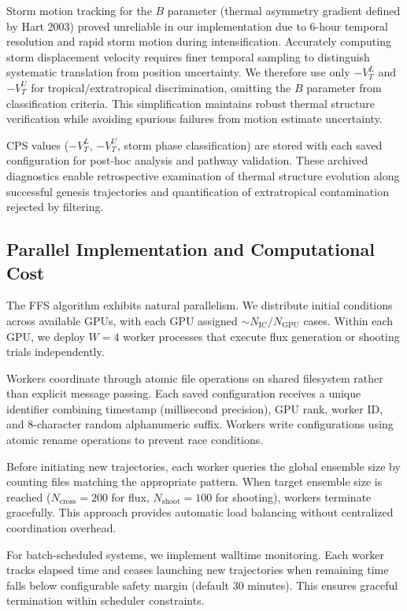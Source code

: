 \documentclass[11pt]{article}
\begin{document}
Storm motion tracking for the $B$ parameter (thermal asymmetry gradient defined by Hart 2003) proved unreliable in our implementation due to 6-hour temporal resolution and rapid storm motion during intensification. Accurately computing storm displacement velocity requires finer temporal sampling to distinguish systematic translation from position uncertainty. We therefore use only $-V_T^L$ and $-V_T^U$ for tropical/extratropical discrimination, omitting the $B$ parameter from classification criteria. This simplification maintains robust thermal structure verification while avoiding spurious failures from motion estimate uncertainty.

CPS values ($-V_T^L$, $-V_T^U$, storm phase classification) are stored with each saved configuration for post-hoc analysis and pathway validation. These archived diagnostics enable retrospective examination of thermal structure evolution along successful genesis trajectories and quantification of extratropical contamination rejected by filtering.

\subsection{Parallel Implementation and Computational Cost}

The FFS algorithm exhibits natural parallelism. We distribute initial conditions across available GPUs, with each GPU assigned $\sim N_{\text{IC}}/N_{\text{GPU}}$ cases. Within each GPU, we deploy $W = 4$ worker processes that execute flux generation or shooting trials independently.

Workers coordinate through atomic file operations on shared filesystem rather than explicit message passing. Each saved configuration receives a unique identifier combining timestamp (millisecond precision), GPU rank, worker ID, and 8-character random alphanumeric suffix. Workers write configurations using atomic rename operations to prevent race conditions.

Before initiating new trajectories, each worker queries the global ensemble size by counting files matching the appropriate pattern. When target ensemble size is reached ($N_{\text{cross}} = 200$ for flux, $N_{\text{shoot}} = 100$ for shooting), workers terminate gracefully. This approach provides automatic load balancing without centralized coordination overhead.

For batch-scheduled systems, we implement walltime monitoring. Each worker tracks elapsed time and ceases launching new trajectories when remaining time falls below configurable safety margin (default 30 minutes). This ensures graceful termination within scheduler constraints.
\end{document}
